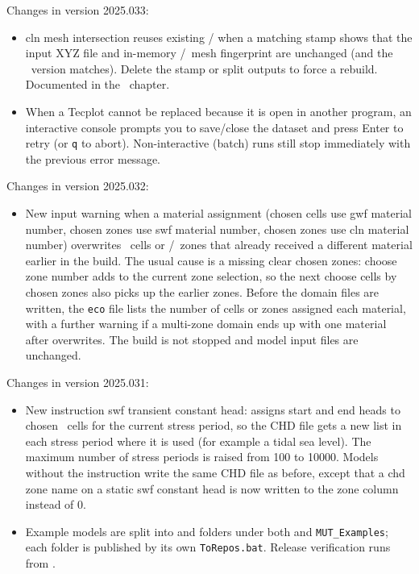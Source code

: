 \label{changes:2025.033}
Changes in version 2025.033:
\begin{itemize}
\item {\sf cln mesh intersection} reuses existing  /  when a matching  stamp shows that the input XYZ file and in-memory \gwf/\swf\ mesh fingerprint are unchanged (and the \mut\ version matches). Delete the stamp or split outputs to force a rebuild. Documented in the \cln\ chapter.
\item When a Tecplot  cannot be replaced because it is open in another program, an interactive console prompts you to save/close the dataset and press Enter to retry (or {\tt q} to abort). Non-interactive (batch) runs still stop immediately with the previous error message.
\end{itemize}

\label{changes:2025.032}
Changes in version 2025.032:
\begin{itemize}
\item New input warning when a material assignment ({\sf chosen cells use gwf material number}, {\sf chosen zones use swf material number}, {\sf chosen zones use cln material number}) overwrites \gwf\ cells or \swf/\cln\ zones that already received a different material earlier in the build. The usual cause is a missing {\sf clear chosen zones}: {\sf choose zone number} adds to the current zone selection, so the next {\sf choose cells by chosen zones} also picks up the earlier zones. Before the domain files are written, the \texttt{eco} file lists the number of cells or zones assigned each material, with a further warning if a multi-zone domain ends up with one material after overwrites. The build is not stopped and model input files are unchanged.
\end{itemize}

\label{changes:2025.031}
Changes in version 2025.031:
\begin{itemize}
\item New instruction {\sf swf transient constant head}: assigns start and end heads to chosen \swf\ cells for the current stress period, so the CHD file gets a new list in each stress period where it is used (for example a tidal sea level). The maximum number of stress periods is raised from 100 to 10000. Models without the instruction write the same CHD file as before, except that a {\sf chd zone name} on a static {\sf swf constant head} is now written to the zone column instead of 0.
\item Example models are split into  and  folders under both  and \texttt{MUT\_Examples}; each folder is published by its own \texttt{ToRepos.bat}. Release verification runs from .
\end{itemize}

